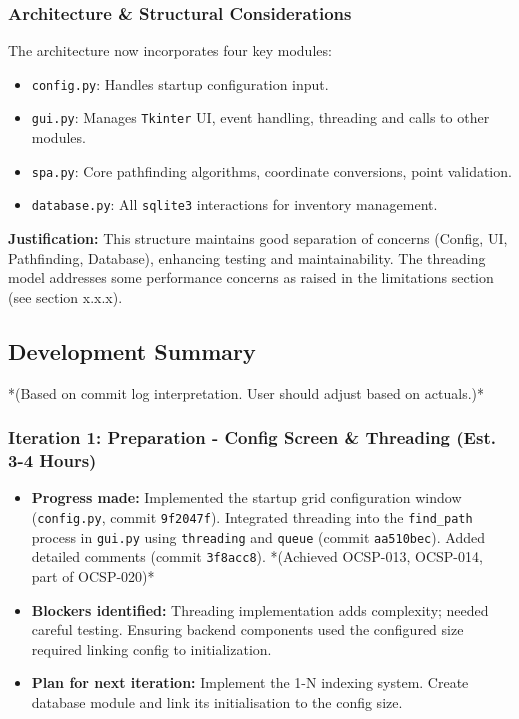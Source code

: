 \subsubsection{Architecture \& Structural Considerations}

The architecture now incorporates four key modules:
\begin{itemize}
	\item \texttt{config.py}: Handles startup configuration input.
	\item \texttt{gui.py}: Manages \texttt{Tkinter} UI, event handling, threading and calls to other modules.
	\item \texttt{spa.py}: Core pathfinding algorithms, coordinate conversions, point validation.
	\item \texttt{database.py}: All \texttt{sqlite3} interactions for inventory management.
\end{itemize}
\textbf{Justification:} This structure maintains good separation of concerns (Config, UI, Pathfinding, Database), enhancing testing and maintainability. The threading model addresses some performance concerns as raised in the limitations section (see section x.x.x).


\newpage

\subsection{Development Summary}

*(Based on commit log interpretation. User should adjust based on actuals.)*

\subsubsection{Iteration 1: Preparation - Config Screen \& Threading (Est. 3-4 Hours)}
\begin{itemize}
	\item \textbf{Progress made:} Implemented the startup grid configuration window (\texttt{config.py}, commit \texttt{9f2047f}). Integrated threading into the \texttt{find\_path} process in \texttt{gui.py} using \texttt{threading} and \texttt{queue} (commit \texttt{aa510bec}). Added detailed comments (commit \texttt{3f8acc8}). *(Achieved OCSP-013, OCSP-014, part of OCSP-020)*
	\item \textbf{Blockers identified:} Threading implementation adds complexity; needed careful testing. Ensuring backend components used the configured size required linking config to initialization.
	\item \textbf{Plan for next iteration:} Implement the 1-N indexing system. Create database module and link its initialisation to the config size.
\end{itemize}

